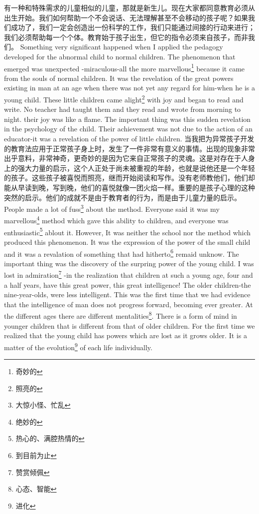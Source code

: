 \documentclass[lang=cn,10pt]{elegantbook}
\begin{document}
有一种和特殊需求的儿童相似的儿童，那就是新生儿。现在大家都同意教育必须从出生开始。我们如何帮助一个不会说话、无法理解甚至不会移动的孩子呢？如果我们成功了，我们一定会创造出一份科学的工作，我们只能通过间接的行动来进行；我们必须帮助每一个个体。教育始于孩子出生，但它的指令必须来自孩子，而非我们。
Something very significant happened when I applied the pedagogy developed for the abnormal child to normal children. The phenomenon that emerged was unexpected -miraculous-all the more marvellous\footnote{奇妙的} because it came from the souls of normal children. It was the revelation of the great powers existing in man at an age when there was not yet any regard for him-when he is a young child. These little children came alight\footnote{照亮的} with joy and began to read and write. No teacher had taught them and they read and wrote from morning to night. their joy was like a flame. The important thing was this sudden revelation in the psychology of the child. Their achievement was not due to the action of an educator-it was a revelation of the power of little children.
当我把为异常孩子开发的教育法应用于正常孩子身上时，发生了一件非常有意义的事情。出现的现象非常出乎意料，非常神奇，更奇妙的是因为它来自正常孩子的灵魂。这是对存在于人身上的强大力量的启示，这个人正处于尚未被重视的年龄，也就是说他还是一个年轻的孩子。这些孩子被喜悦而照亮，继而开始阅读和写作。没有老师教他们，他们却能从早读到晚，写到晚，他们的喜悦就像一团火焰一样。重要的是孩子心理的这种突然的启示。他们的成就不是由于教育者的行为，而是由于儿童力量的启示。
People made a lot of fuss\footnote{大惊小怪、忙乱} about the method. Everyone said it was my marvellous\footnote{绝妙的} method which gave this ability to children, and everyone was enthusiastic\footnote{热心的、满腔热情的} ablout it. However, It was neither the school nor the method which produced this phenomenon. It was the expression of the power of the small child and it was a revalation of something that had hitherto\footnote{到目前为止} remaid unknow. The important thing was the discovery of the surpring power of the young child. I was lost in admiration\footnote{赞赏倾佩} -in the realization that children at such a young age, four and a half years, have this great power, this great intelligence! The older children-the nine-year-olds, were less intelligent. This was the first time that we had evidence that the intelligence of man does not progress forward, becoming ever greater. At the different ages there are different mentalities\footnote{心态、智能}. There is a form of mind in younger children that is different from that of older children. For the first time we realized that the young child has powers which are lost as it grows older. It is a matter of the evolution\footnote{进化} of each life individually.
\end{document}
